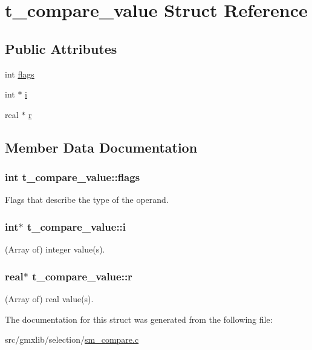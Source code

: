\hypertarget{structt__compare__value}{\section{t\-\_\-compare\-\_\-value \-Struct \-Reference}
\label{structt__compare__value}
}
\subsection*{\-Public \-Attributes}
\begin{DoxyCompactItemize}
\item 
int \hyperlink{structt__compare__value_a9078ebf90cf6e21a0edac98dec351e96}{flags}
\item 
int $\ast$ \hyperlink{structt__compare__value_ae00dccfabf811060dd03ada02807ef94}{i}
\item 
real $\ast$ \hyperlink{structt__compare__value_a1b111721fc44d7a544610d3ba0ce0ee2}{r}
\end{DoxyCompactItemize}


\subsection{\-Member \-Data \-Documentation}
\hypertarget{structt__compare__value_a9078ebf90cf6e21a0edac98dec351e96}{
\subsubsection[{flags}]{\setlength{\rightskip}{0pt plus 5cm}int {\bf t\-\_\-compare\-\_\-value\-::flags}}}\label{structt__compare__value_a9078ebf90cf6e21a0edac98dec351e96}
\-Flags that describe the type of the operand. \hypertarget{structt__compare__value_ae00dccfabf811060dd03ada02807ef94}{
\subsubsection[{i}]{\setlength{\rightskip}{0pt plus 5cm}int$\ast$ {\bf t\-\_\-compare\-\_\-value\-::i}}}\label{structt__compare__value_ae00dccfabf811060dd03ada02807ef94}
(\-Array of) integer value(s). \hypertarget{structt__compare__value_a1b111721fc44d7a544610d3ba0ce0ee2}{
\subsubsection[{r}]{\setlength{\rightskip}{0pt plus 5cm}real$\ast$ {\bf t\-\_\-compare\-\_\-value\-::r}}}\label{structt__compare__value_a1b111721fc44d7a544610d3ba0ce0ee2}
(\-Array of) real value(s). 

\-The documentation for this struct was generated from the following file\-:\begin{DoxyCompactItemize}
\item 
src/gmxlib/selection/\hyperlink{sm__compare_8c}{sm\-\_\-compare.\-c}\end{DoxyCompactItemize}
